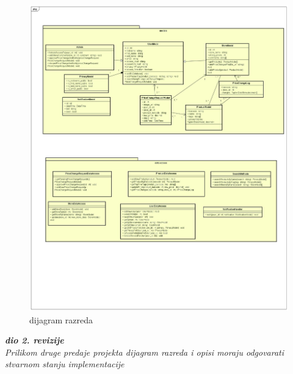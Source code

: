 \begin{figure}[H]
			\includegraphics[width=\textwidth]{slike/dijagramRazreda.png} %
			\caption{dijagram razreda}
			\label{fig:dijagramRazreda} %
			\end{figure}
			
			
			
			\textbf{\textit{dio 2. revizije}}\\			
			
			\textit{Prilikom druge predaje projekta dijagram razreda i opisi moraju odgovarati stvarnom stanju implementacije}
			
